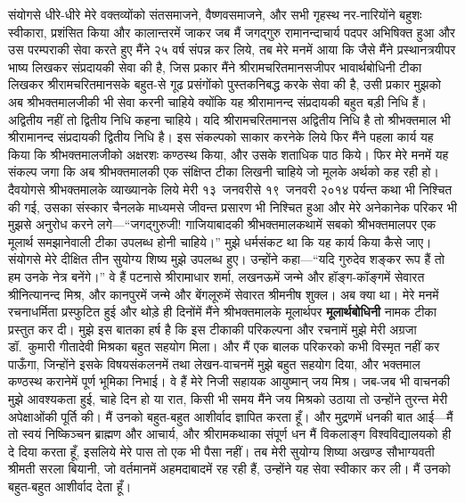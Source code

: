 \begin{sloppypar}
संयोगसे धीरे-धीरे मेरे वक्तव्योंको संत\-समाजने, वैष्णव\-समाजने, और सभी गृहस्थ नर-नारियोंने बहुशः स्वीकारा, प्रशंसित किया और कालान्तरमें जाकर जब मैं जगद्गुरु रामानन्दाचार्य पदपर अभिषिक्त हुआ और उस परम्पराकी सेवा करते हुए मैंने २५ वर्ष संपन्न कर लिये, तब मेरे मनमें आया कि जैसे मैंने प्रस्थानत्रयीपर भाष्य लिखकर संप्रदायकी सेवा की है, जिस प्रकार मैंने श्रीरामचरितमानसजीपर भावार्थबोधिनी टीका लिखकर श्रीरामचरितमानसके बहुत-से गूढ प्रसंगोंको पुस्तकनिबद्ध करके सेवा की है, उसी प्रकार मुझको अब श्रीभक्तमालजीकी भी सेवा करनी चाहिये क्योंकि यह श्रीरामानन्द संप्रदायकी बहुत बड़ी निधि हैं। अद्वितीय नहीं तो द्वितीय निधि कहना चाहिये। यदि श्रीरामचरितमानस अद्वितीय निधि है तो श्रीभक्तमाल भी श्रीरामानन्द संप्रदायकी द्वितीय निधि है। इस संकल्पको साकार करनेके लिये फिर मैंने पहला कार्य यह किया कि श्रीभक्तमालजीको अक्षरशः कण्ठस्थ किया, और उसके शताधिक पाठ किये। फिर मेरे मनमें यह संकल्प जगा कि अब श्रीभक्तमालकी एक संक्षिप्त टीका लिखनी चाहिये जो मूलके अर्थको कह रही हो। दैवयोगसे श्रीभक्तमालके व्याख्यानके लिये मेरी १३~जनवरीसे १९~जनवरी २०१४ पर्यन्त कथा भी निश्चित की गई, उसका संस्कार चैनलके माध्यमसे जीवन्त प्रसारण भी निश्चित हुआ और मेरे अनेकानेक परिकर भी मुझसे अनुरोध करने लगे—“जगद्गुरुजी! गाजियाबादकी श्रीभक्तमालकथामें सबको श्रीभक्तमालपर एक मूलार्थ समझानेवाली टीका उपलब्ध होनी चाहिये।” मुझे धर्मसंकट था कि यह कार्य किया कैसे जाए। संयोगसे मेरे दीक्षित तीन सुयोग्य शिष्य मुझे उपलब्ध हुए। उन्होंने कहा—“यदि गुरुदेव शङ्कर रूप हैं तो हम उनके नेत्र बनेंगे।” वे हैं पटनासे श्रीरामाधार शर्मा, लखनऊमें जन्मे और हॉङ्ग-कॉङ्गमें सेवारत श्रीनित्यानन्द मिश्र, और कानपुरमें जन्मे और बेंगलूरुमें सेवारत श्रीमनीष शुक्ल। अब क्या था। मेरे मनमें रचनाधर्मिता प्रस्फुटित हुई और थोड़े ही दिनोंमें मैंने श्रीभक्तमालके मूलार्थपर \textbf{मूलार्थबोधिनी} नामक टीका प्रस्तुत कर दी। मुझे इस बातका हर्ष है कि इस टीकाकी परिकल्पना और रचनामें मुझे मेरी अग्रजा डॉ.~कुमारी गीतादेवी मिश्रका बहुत सहयोग मिला। और मैं एक बालक परिकरको कभी विस्मृत नहीं कर पाऊँगा, जिन्होंने इसके विषय\-संकलनमें तथा लेखन-वाचनमें मुझे बहुत सहयोग दिया, और भक्तमाल कण्ठस्थ करानेमें पूर्ण भूमिका निभाई। वे हैं मेरे निजी सहायक आयुष्मान् जय मिश्र। जब-जब भी वाचनकी मुझे आवश्यकता हुई, चाहे दिन हो या रात, किसी भी समय मैंने जय मिश्रको उठाया तो उन्होंने तुरन्त मेरी अपेक्षाओंकी पूर्ति की। मैं उनको बहुत-बहुत आशीर्वाद ज्ञापित करता हूँ। और मुद्रणमें धनकी बात आई—मैं तो स्वयं निष्किञ्चन ब्राह्मण और आचार्य, और श्रीराम\-कथाका संपूर्ण धन मैं विकलाङ्ग विश्वविद्यालयको ही दे दिया करता हूँ, इसलिये मेरे पास तो एक भी पैसा नहीं। तब मेरी सुयोग्य शिष्या अखण्ड सौभाग्यवती श्रीमती सरला बियानी, जो वर्तमानमें अहमदाबादमें रह रही हैं, उन्होंने यह सेवा स्वीकार कर ली। मैं उनको बहुत-बहुत आशीर्वाद देता हूँ। 

\end{sloppypar}
